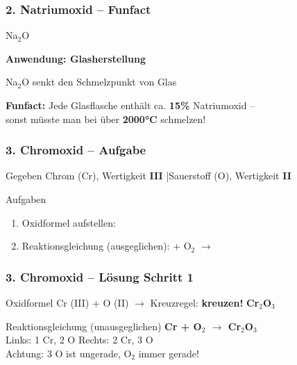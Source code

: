 \documentclass[aspectratio=169, 12pt]{beamer}
\newcommand{\lsg}[1]{\textcolor{loesung}{\textbf{#1}}}
\newcommand{\luecke}{\underline{\hspace{2.5cm}}}
\begin{document}
\begin{frame}
\frametitle{2. Natriumoxid – Funfact}
\begin{center}
\vspace{0.3cm}
{\Huge \textcolor{chemie}{Na$_2$O}}
\vspace{0.8cm}

{\Large\textbf{Anwendung: Glasherstellung}}
\vspace{0.5cm}

Na$_2$O senkt den Schmelzpunkt von Glas
\vspace{0.8cm}

\textcolor{akzent}{\textbf{Funfact:}} Jede Glasflasche enthält ca. \textbf{15\%} Natriumoxid –\\
sonst müsste man bei über \textbf{2000°C} schmelzen!
\end{center}
\end{frame}


\begin{frame}
\frametitle{3. Chromoxid – Aufgabe}
\begin{block}{Gegeben}
Chrom (Cr), Wertigkeit \textbf{III} \quad|\quad Sauerstoff (O), Wertigkeit \textbf{II}
\end{block}
\vspace{0.5cm}
\begin{block}{Aufgaben}
\begin{enumerate}
\item Oxidformel aufstellen: \luecke
\item Reaktionsgleichung (ausgeglichen): \quad \luecke{} + O$_2$ $\rightarrow$ \luecke
\end{enumerate}
\end{block}
\end{frame}

\begin{frame}
\frametitle{3. Chromoxid – Lösung Schritt 1}
\begin{block}{Oxidformel}
Cr (III) + O (II) $\rightarrow$ Kreuzregel: \textbf{kreuzen!} \hfill \lsg{Cr$_2$O$_3$}
\end{block}
\vspace{0.3cm}
\begin{block}{Reaktionsgleichung (unausgeglichen)}
\lsg{Cr + O$_2$ $\rightarrow$ Cr$_2$O$_3$}\\[0.3cm]
Links: 1 Cr, 2 O \quad Rechts: 2 Cr, 3 O\\[0.2cm]
\textcolor{akzent}{Achtung:} 3 O ist ungerade, O$_2$ immer gerade!
\end{block}
\end{frame}
\end{document}
